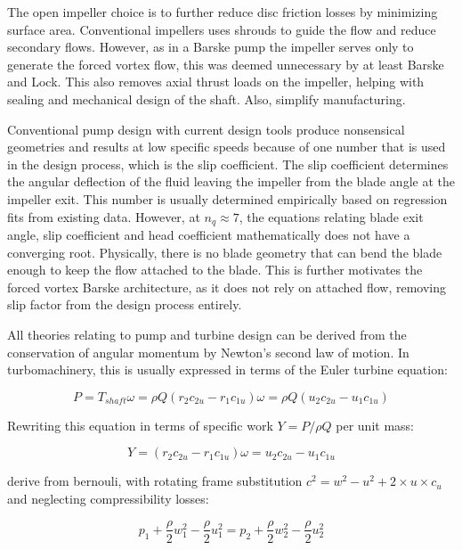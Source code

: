 The open impeller choice is to further reduce disc friction losses  by minimizing surface area. Conventional impellers uses shrouds to guide the flow and reduce secondary flows. However, as in a Barske pump the impeller serves only to generate the forced vortex flow, this was deemed unnecessary by at least Barske and Lock. This also removes axial thrust loads on the impeller, helping with sealing and mechanical design of the shaft. Also, simplify manufacturing.

Conventional pump design with current design tools produce nonsensical geometries and results at low specific speeds because of one number that is used in the design process, which is the slip coefficient. The slip coefficient determines the angular deflection of the fluid leaving the impeller from the blade angle at the impeller exit. This number is usually determined empirically based on regression fits from existing data. However, at $n_q\approx 7$, the equations relating blade exit angle, slip coefficient and head coefficient mathematically does not have a converging root. Physically, there is no blade geometry that can bend the blade enough to keep the flow attached to the blade. This is further motivates the forced vortex Barske architecture, as it does not rely on attached flow, removing slip factor from the design process entirely.

All theories relating to pump and turbine design can be derived from the conservation of angular momentum by Newton's second law of motion. In turbomachinery, this is usually expressed in terms of the Euler turbine equation:

\begin{equation}
    P=T_{shaft}\omega=\rho Q \left(r_2 c_{2u} - r_1 c_{1u}\right)\omega=\rho Q\left(u_2c_{2u}-u_1c_{1u}\right)
    \label{eq:euler_turbine_equation}
\end{equation}

Rewriting this equation in terms of specific work $Y=P/\rho Q$ per unit mass:

\begin{equation}
    Y = \left(r_2 c_{2u} - r_1 c_{1u}\right)\omega = u_2c_{2u}-u_1c_{1u}
     \label{eq:euler_specific_work}
\end{equation}

derive from bernouli, with rotating frame substitution $c^2=w^2-u^2+2\times u \times c_u$ and neglecting compressibility losses:

$$p_{1}+\frac{\rho}{2}w_{1}^2-\frac{\rho}{2}u_{1}^2=p_{2}+\frac{\rho}{2}w_{2}^2-\frac{\rho}{2}u_{2}^2$$


